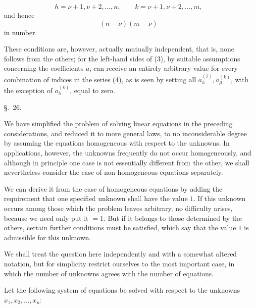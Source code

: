 
\begin{equation}
 h=\nu+1,\nu+2,\ldots,n,
 \qquad
 k=\nu+1,\nu+2,\ldots,m,
\tag{4}
\end{equation}
and hence
\begin{equation}
        (n-\nu)(m-\nu)
\tag{5}
\end{equation}
in number.

These conditions are, however, actually mutually independent, that is, none follows from the others; for the left-hand sides of (3), by suitable assumptions concerning the coefficients \(a\), can receive an entirely arbitrary value for every combination of indices in the series (4), as is seen by setting all \(a_h^{(i)},a_\mu^{(k)}\), with the exception of \(a_h^{(k)}\), equal to zero.

\begin{center}
{\large \S.\ 26.}

\vspace{0.5em}
{\large{}}
\end{center}

We have simplified the problem of solving linear equations in the preceding considerations, and reduced it to more general laws, to no inconsiderable degree by assuming the equations homogeneous with respect to the unknowns. In applications, however, the unknowns frequently do not occur homogeneously, and although in principle one case is not essentially different from the other, we shall nevertheless consider the case of non-homogeneous equations separately.

We can derive it from the case of homogeneous equations by adding the requirement that one specified unknown shall have the value \(1\). If this unknown occurs among those which the problem leaves arbitrary, no difficulty arises, because we need only put it \(=1\). But if it belongs to those determined by the others, certain further conditions must be satisfied, which say that the value \(1\) is admissible for this unknown.

We shall treat the question here independently and with a somewhat altered notation, but for simplicity restrict ourselves to the most important case, in which the number of unknowns agrees with the number of equations.

Let the following system of equations be solved with respect to the unknowns \(x_1,x_2,\ldots,x_n\):
